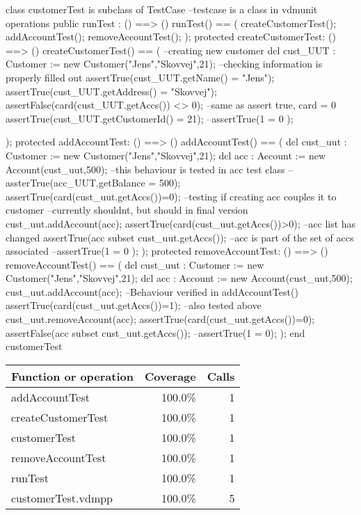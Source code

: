 \documentclass[a4paper]{article}
\begin{document}
\title{}
\author{}
\begin{vdm_al}

class customerTest is subclass of TestCase --testcase is a class in vdmunit
operations
    public runTest : () ==> ()
    runTest() == (
        createCustomerTest();
        addAccountTest();
        removeAccountTest();
    );
    protected createCustomerTest: () ==> ()
    createCustomerTest() == (
      --creating new customer
      dcl cust_UUT : Customer := new Customer("Jens","Skovvej",21);
      --checking information is properly filled out
      assertTrue(cust_UUT.getName() = "Jens");
      assertTrue(cust_UUT.getAddress() = "Skovvej");
      assertFalse(card(cust_UUT.getAccs()) <> 0); --same as assert true, card = 0
      assertTrue(cust_UUT.getCustomerId() = 21);
      --assertTrue(1 = 0 );

    );
    protected addAccountTest: () ==> ()
    addAccountTest() == (
      dcl cust_uut : Customer := new Customer("Jens","Skovvej",21);
      dcl acc : Account := new Account(cust_uut,500); --this behaviour is tested in acc test class
      --assterTrue(acc_UUT.getBalance = 500);
      assertTrue(card(cust_uut.getAccs())=0); --testing if creating acc couples it to customer
      --currently shouldnt, but should in final version
      cust_uut.addAccount(acc);
      assertTrue(card(cust_uut.getAccs())>0); --acc list has changed
      assertTrue({acc} subset cust_uut.getAccs()); --acc is part of the set of accs associated
      --assertTrue(1 = 0 );
    );
    protected removeAccountTest: () ==> ()
    removeAccountTest() == (
      dcl cust_uut : Customer := new Customer("Jens","Skovvej",21);
      dcl acc : Account := new Account(cust_uut,500); 
      cust_uut.addAccount(acc); --Behaviour verified in addAccountTest()
      assertTrue(card(cust_uut.getAccs())=1); --also tested above
      cust_uut.removeAccount(acc);
      assertTrue(card(cust_uut.getAccs())=0);
      assertFalse({acc} subset cust_uut.getAccs());
      --assertTrue(1 = 0);
    );
end customerTest
\end{vdm_al}
\bigskip
\begin{longtable}{|l|r|r|}
\hline
Function or operation & Coverage & Calls \\
\hline
\hline
addAccountTest & 100.0\% & 1 \\
\hline
createCustomerTest & 100.0\% & 1 \\
\hline
customerTest & 100.0\% & 1 \\
\hline
removeAccountTest & 100.0\% & 1 \\
\hline
runTest & 100.0\% & 1 \\
\hline
\hline
customerTest.vdmpp & 100.0\% & 5 \\
\hline
\end{longtable}
\end{document}
